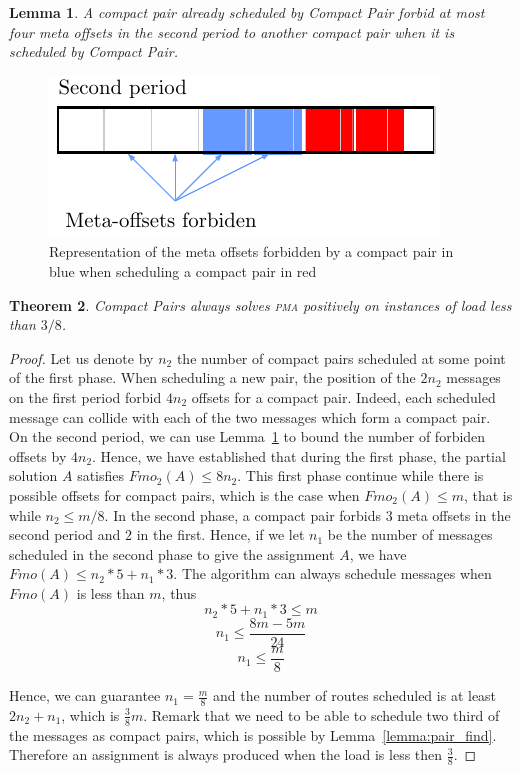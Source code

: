 \documentclass[10pt, conference, letterpaper]{IEEEtran}
\newtheorem{theorem}{Theorem}
\newtheorem{lemma}[theorem]{Lemma}
\newcommand\pma{\textsc{pma}\xspace}
\begin{document}
\begin{lemma}\label{lemma:pair_forbid}
A compact pair already scheduled by Compact Pair forbid at most four meta offsets in the second period to another compact pair when it is scheduled by Compact Pair.
\end{lemma}

\begin{figure}
\begin{center}
\includegraphics[scale=0.7]{pairforbiden}
\end{center}

\caption{Representation of the meta offsets forbidden by a compact pair in blue when scheduling a compact pair in red} 
\label{fig:forbidenmeta}
\end{figure}
\begin{theorem}
Compact Pairs always solves \pma positively on instances of load less than
$3/8$.
\end{theorem}
\begin{proof}
Let us denote by $n_2$ the number of compact pairs scheduled at some point of 
the first phase. When scheduling a new pair, the position of the $2n_2$ messages on the first
period forbid $4n_2$ offsets for a compact pair. Indeed, each scheduled message can collide
with each of the two messages which form a compact pair. On the second period, we can use Lemma~\ref{lemma:pair_forbid} to bound the number of forbiden offsets by $4n_2$. 
Hence, we have established that during the first phase, the partial solution $A$
satisfies $Fmo_2(A) \leq 8n_2$. This first phase continue while there is possible offsets for compact pairs, which is the case when $Fmo_2(A) \leq m$, that is while $n_2 \leq m/8$.
In the second phase, a compact pair forbids $3$ meta offsets in the 
second period and $2$ in the first. Hence, if we let $n_1$ be the number of messages scheduled in the second phase to give the assignment $A$, we have $Fmo(A) \leq n_2*5 + n_1*3$. 
The algorithm can always schedule messages when $Fmo(A)$ is less than $m$, thus
$$ n_2*5 + n_1*3 \leq m$$
$$ n_1 \leq \frac{8m - 5m }{24}$$
$$n_1 \leq \frac{m}{8}$$

Hence, we can guarantee $n_1 = \frac{m}{8}$ and the number of routes scheduled is at least $2n_2 + n_1$,
which is $\frac{3}{8}m$. Remark that we need to be able to schedule two third of the messages as compact pairs, which is possible by Lemma~\ref{lemma:pair_find}. Therefore an assignment is always produced when the load is less then $\frac{3}{8}$.
\end{proof}
\end{document}
